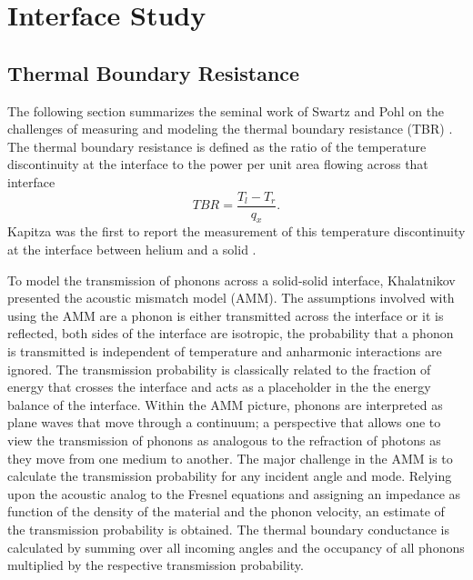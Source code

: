 \chapter{Interface Study}\label{CHP:Interface}

\section{Thermal Boundary Resistance}
The following section summarizes the seminal work of Swartz and Pohl on the challenges of measuring and modeling the thermal boundary resistance (TBR) \cite{RevModPhys.61.605}. The thermal boundary resistance is defined as the ratio of the temperature discontinuity at the interface to the power per unit area flowing across that interface
\begin{equation}
TBR=\frac{T_l-T_r}{q_x}.
\end{equation}
Kapitza was the first to report the measurement of this temperature discontinuity at the interface between helium and a solid \cite{kapitza1941study}.

To model the transmission of phonons across a solid-solid interface, Khalatnikov \cite{khalatnikov1973theory} presented the acoustic mismatch model (AMM). The assumptions involved with using the AMM are a phonon is either transmitted across the interface or it is reflected, both sides of the interface are isotropic, the probability that a phonon is transmitted is independent of temperature and anharmonic interactions are ignored. The transmission probability is classically related to the fraction of energy that crosses the interface and acts as a placeholder in the the energy balance of the interface. Within the AMM picture, phonons are interpreted as plane waves that move through a continuum; a perspective that allows one to view the transmission of phonons as analogous to the refraction of photons as they move from one medium to another. The major challenge in the AMM is to calculate the transmission probability for any incident angle and mode. Relying upon the acoustic analog to the Fresnel equations and assigning an impedance as function of the density of the material and the phonon velocity, an estimate of the transmission probability is obtained. The thermal boundary conductance is calculated by summing over all incoming angles and the occupancy of all phonons multiplied by the respective transmission probability.

